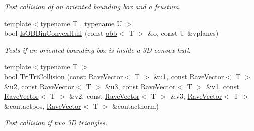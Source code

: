 \begin{DoxyCompactItemize}
\begin{DoxyCompactList}\small\item\em Test collision of an oriented bounding box and a frustum. \item\end{DoxyCompactList}\item 
{\footnotesize template$<$typename T , typename U $>$ }\\bool \hyperlink{group__geometric__primitives_ga0d29be0998203e5a7b521ccb728533f6}{IsOBBinConvexHull} (const \hyperlink{classOpenRAVE_1_1geometry_1_1obb}{obb}$<$ T $>$ \&o, const U \&vplanes)
\begin{DoxyCompactList}\small\item\em Tests if an oriented bounding box is inside a 3D convex hull. \item\end{DoxyCompactList}\item 
{\footnotesize template$<$typename T $>$ }\\bool \hyperlink{group__geometric__primitives_ga07425830ea25e001f8682da7f2504875}{TriTriCollision} (const \hyperlink{classOpenRAVE_1_1geometry_1_1RaveVector}{RaveVector}$<$ T $>$ \&u1, const \hyperlink{classOpenRAVE_1_1geometry_1_1RaveVector}{RaveVector}$<$ T $>$ \&u2, const \hyperlink{classOpenRAVE_1_1geometry_1_1RaveVector}{RaveVector}$<$ T $>$ \&u3, const \hyperlink{classOpenRAVE_1_1geometry_1_1RaveVector}{RaveVector}$<$ T $>$ \&v1, const \hyperlink{classOpenRAVE_1_1geometry_1_1RaveVector}{RaveVector}$<$ T $>$ \&v2, const \hyperlink{classOpenRAVE_1_1geometry_1_1RaveVector}{RaveVector}$<$ T $>$ \&v3, \hyperlink{classOpenRAVE_1_1geometry_1_1RaveVector}{RaveVector}$<$ T $>$ \&contactpos, \hyperlink{classOpenRAVE_1_1geometry_1_1RaveVector}{RaveVector}$<$ T $>$ \&contactnorm)
\begin{DoxyCompactList}\small\item\em Test collision if two 3D triangles.


\end{DoxyCompactList}
\end{DoxyCompactItemize}
